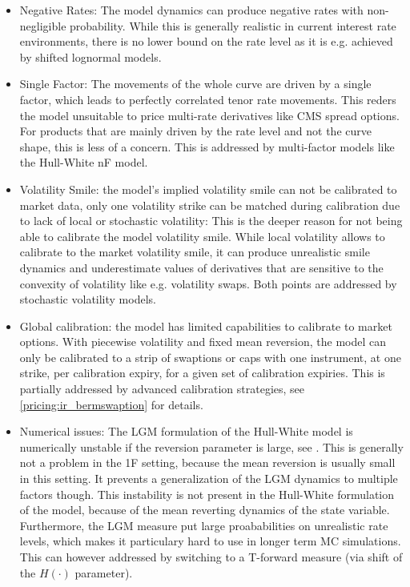 \begin{itemize}
\item Negative Rates: The model dynamics can produce negative rates with non-negligible probability. While this is
  generally realistic in current interest rate environments, there is no lower bound on the rate level as it is
  e.g. achieved by shifted lognormal models.
\item Single Factor: The movements of the whole curve are driven by a single factor, which leads to perfectly correlated
  tenor rate movements. This reders the model unsuitable to price multi-rate derivatives like CMS spread options. For
  products that are mainly driven by the rate level and not the curve shape, this is less of a concern. This is
  addressed by multi-factor models like the Hull-White nF model.
\item Volatility Smile: the model's implied volatility smile can not be calibrated to market data, only one volatility
  strike can be matched during calibration due to lack of local or stochastic volatility: This is the deeper reason for
  not being able to calibrate the model volatility smile. While local volatility allows to calibrate to the market
  volatility smile, it can produce unrealistic smile dynamics and underestimate values of derivatives that are sensitive
  to the convexity of volatility like e.g. volatility swaps. Both points are addressed by stochastic volatility models.
\item Global calibration: the model has limited capabilities to calibrate to market options. With piecewise volatility
  and fixed mean reversion, the model can only be calibrated to a strip of swaptions or caps with one instrument, at one
  strike, per calibration expiry, for a given set of calibration expiries.  This is partially addressed by advanced
  calibration strategies, see \ref{pricing:ir_bermswaption} for details.
\item Numerical issues: The LGM formulation of the Hull-White model is numerically unstable if the reversion parameter
  is large, see \cite{LGM_Large_Reversion}. This is generally not a problem in the 1F setting, because the mean
  reversion is usually small in this setting. It prevents a generalization of the LGM dynamics to multiple factors
  though. This instability is not present in the Hull-White formulation of the model, because of the mean reverting
  dynamics of the state variable. Furthermore, the LGM measure put large proababilities on unrealistic rate levels,
  which makes it particulary hard to use in longer term MC simulations. This can however addressed by switching to a
  T-forward measure (via shift of the $H(\cdot)$ parameter).
\end{itemize}


